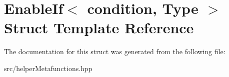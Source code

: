 \hypertarget{structEnableIf}{}\section{Enable\+If$<$ condition, Type $>$ Struct Template Reference}
\label{structEnableIf}


The documentation for this struct was generated from the following file\+:\begin{DoxyCompactItemize}
\item 
src/helper\+Metafunctions.\+hpp\end{DoxyCompactItemize}
